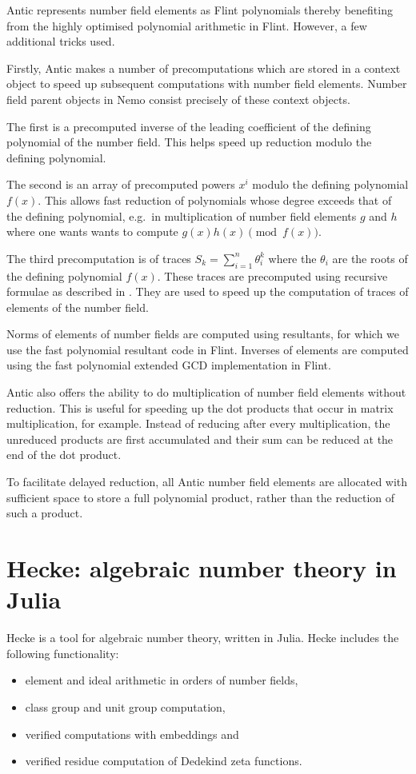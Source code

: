 \documentclass{sig-alternate-05-2015}
\begin{document}
Antic represents number field elements as Flint polynomials thereby benefiting
from the highly optimised polynomial arithmetic in Flint. However, a few
additional tricks used.

Firstly, Antic makes a number of precomputations which are stored in a context
object to speed up subsequent computations with number field elements. Number field parent
objects in Nemo consist precisely of these context objects.

The first is a precomputed inverse of the leading coefficient of the defining
polynomial of the number field. This helps speed up reduction modulo the defining polynomial.

The second is an array of precomputed powers $x^i$ modulo the
defining polynomial $f(x)$. This allows fast reduction of polynomials whose degree exceeds
that of the defining polynomial, e.g.\ in multiplication of number field elements $g$ and $h$
where one wants wants to compute $g(x)h(x) \pmod{f(x)}$.

The third precomputation is of traces $S_k = \sum_{i=1}^n \theta_i^k$ where the $\theta_i$
are the roots of the defining polynomial $f(x)$. These traces are precomputed using
recursive formulae as described in \cite{Cohen1993}. They are
used to speed up the computation of traces of elements of the number field.

Norms of elements of number fields are computed using resultants, for which we use
the fast polynomial resultant code in Flint. Inverses of elements are computed using the fast polynomial
extended GCD implementation in Flint.

Antic also offers the ability to do multiplication of number field elements without
reduction. This is useful for speeding up the dot products that occur in matrix
multiplication, for example. Instead of reducing after every multiplication, the unreduced
products are first accumulated and their sum can be reduced at the end of the dot product.

To facilitate delayed reduction, all Antic number field elements are allocated with
sufficient space to store a full polynomial product, rather than the reduction of such a product.

\section{Hecke: algebraic number theory in Julia}
\label{sect:hecke}

Hecke is a tool for algebraic number theory, written in Julia.
Hecke includes the following functionality:
\begin{itemize}
\setlength{\itemsep}{1pt}
\setlength{\parskip}{0pt}
\setlength{\parsep}{0pt}
\item
  element and ideal arithmetic in orders of number fields,
\item
  class group and unit group computation,
\item
  verified computations with embeddings and
\item
  verified residue computation of Dedekind zeta functions.
\end{itemize}
\end{document}
